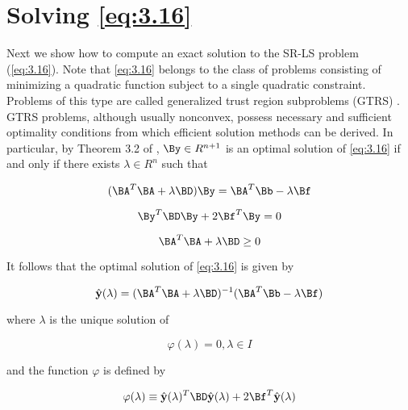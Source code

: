 \startappendix{}
\label{chapter:app1}

\section{Solving \ref{eq:3.16}}

Next we show how to compute an exact solution to the SR-LS problem
(\ref{eq:3.16}). Note that \ref{eq:3.16} belongs to the class of problems
consisting of minimizing a quadratic function subject to a single
quadratic constraint. Problems of this type are called generalized trust
region subproblems (GTRS) \cite{More}. GTRS problems, although usually 
nonconvex, possess necessary and sufficient optimality conditions from
which efficient solution methods can be derived. In particular, by 
Theorem 3.2 of \cite{More}, $\By \in R^{n+1}$ is an optimal solution
of \ref{eq:3.16} if and only if there exists $\lambda \in R^{n}$ 
such that

\begin{equation} \label{eq:A.1}
(\BA^{T}\BA + \lambda\BD)\By = \BA^{T}\Bb - \lambda\Bf
\end{equation}

\begin{equation} \label{eq:A.2}
\By^{T}\BD\By + 2\Bf^{T}\By = 0
\end{equation}

\begin{equation} \label{eq:A.3}
\BA^{T}\BA + \lambda\BD \geq 0
\end{equation}

It follows that the optimal solution of \ref{eq:3.16} is given by

\begin{equation} \label{eq:A.4}
\hat{\mathbf{y}}(\lambda) = (\BA^{T}\BA + \lambda\BD)^{-1}(\BA^{T}\Bb - \lambda\Bf)
\end{equation}

where $\lambda$ is the unique solution of

\begin{equation} \label{eq:A.5}
\varphi(\lambda) = 0, \lambda \in I
\end{equation}

and the function $\varphi$ is defined by

\begin{equation} \label{eq:A.6}
\varphi(\lambda) \equiv \hat{\mathbf{y}}(\lambda)^{T}\BD\hat{\mathbf{y}}(\lambda) + 2\Bf^{T}\hat{\mathbf{y}}(\lambda)
\end{equation}


